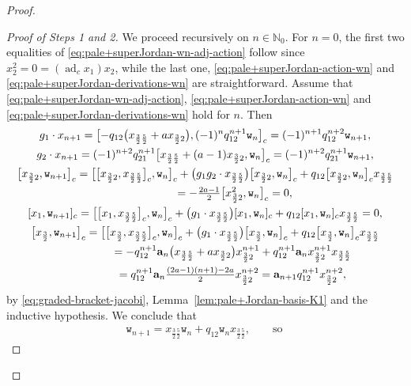 \documentclass[pdftex]{sigma}
\numberwithin{equation}{section}
\newcommand{\adc}{\operatorname{ad}_c}
\newcommand{\ab}{\mathbf a}
\newcommand{\N}{{\mathbb N}}
\newcommand{\wt}{\mathtt{w}}
\newcommand{\tresdos}{\frac{3}{2}}
\newcommand{\cincodos}{\frac{5}{2}}
\begin{document}
\begin{proof}
\begin{proof}[Proof of Steps 1 and 2]
We proceed recursively on $n\in\N_0$.
For $n=0$, the first two equalities of \eqref{eq:pale+superJordan-wn-adj-action} follow since $x_2^2=0=(\adc x_1)x_2$, while the last one, \eqref{eq:pale+superJordan-action-wn} and \eqref{eq:pale+superJordan-derivations-wn} are straightforward.
Assume that \eqref{eq:pale+superJordan-wn-adj-action}, \eqref{eq:pale+superJordan-action-wn} and \eqref{eq:pale+superJordan-derivations-wn} hold for $n$. Then
\begin{gather*}
g_1 \cdot x_{n+1} =
\bigl[ -q_{12}\big(x_{\tresdos\cincodos}+ax_{\tresdos2}\big), (-1)^nq_{12}^{n+1} \wt_n \bigr]_c
= (-1)^{n+1}q_{12}^{n+2} \wt_{n+1},
\\
g_2 \cdot x_{n+1} =
(-1)^{n+2}q_{21}^{n+1} \big[ x_{\tresdos\cincodos}+(a-1)x_{\tresdos2}, \wt_n \big]_c
= (-1)^{n+2}q_{21}^{n+1} \wt_{n+1},
\\
\big[x_{\tresdos2},\wt_{n+1}\big]_c = \big[ \big[x_{\tresdos2}, x_{\tresdos\cincodos}\big]_c, \wt_n \big]_c
+\big(g_1g_2 \cdot x_{\tresdos\cincodos}\big) \big[x_{\tresdos2}, \wt_n \big]_c
+q_{12}\big[x_{\tresdos2}, \wt_n \big]_c x_{\tresdos\cincodos}
\\ \hphantom{[x_{\tresdos2},\wt_{n+1}]_c }
 {} = -\tfrac{2a-1}{2} \big[ x_{\tresdos2}^2, \wt_n \big]_c=0,
\\
[x_1,\wt_{n+1}]_c = \big[ \big[ x_1, x_{\tresdos\cincodos}\big]_c, \wt_n \big]_c
+\big(g_1 \cdot x_{\tresdos\cincodos}\big) [x_1, \wt_n ]_c
+q_{12}[x_1, \wt_n ]_c x_{\tresdos\cincodos} =0,
\\
\big[x_{\tresdos},\wt_{n+1}\big]_c = \big[ \big[ x_{\tresdos}, x_{\tresdos\cincodos}\big]_c, \wt_n \big]_c
+\big(g_1 \cdot x_{\tresdos\cincodos}\big) \big[x_{\tresdos}, \wt_n \big]_c
+q_{12}\big[x_{\tresdos}, \wt_n \big]_c x_{\tresdos\cincodos}
\\ \hphantom{[x_{\tresdos},\wt_{n+1}]_c}
{} =
-q_{12}^{n+1}\ab_n \big(x_{\tresdos\cincodos}+ax_{\tresdos2}\big)x_{\tresdos2}^{n+1}
+q_{12}^{n+1}\ab_n x_{\tresdos2}^{n+1}x_{\tresdos\cincodos}
\\ \hphantom{[x_{\tresdos},\wt_{n+1}]_c}
{} = q_{12}^{n+1}\ab_n \tfrac{(2a-1)(n+1)-2a}{2}x_{\tresdos2}^{n+2} = \ab_{n+1}q_{12}^{n+1} x_{\tresdos2}^{n+2},
\end{gather*}
by \eqref{eq:graded-bracket-jacobi}, Lemma~\ref{lem:pale+Jordan-basis-K1} and the inductive hypothesis.
We conclude that
\begin{align*}
&\wt_{n+1}=x_{\tresdos\cincodos}\wt_n+q_{12}\wt_nx_{\tresdos\cincodos},\qquad \text{so}\quad

\end{align*}
\end{proof}
\end{proof}
\end{document}
